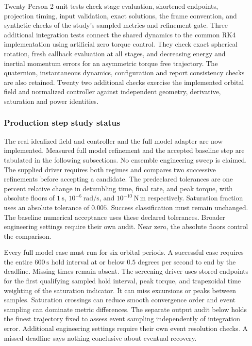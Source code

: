 Twenty Person 2 unit tests check stage evaluation, shortened endpoints,
projection timing, input validation, exact solutions, the frame convention,
and synthetic checks of the study's sampled metrics and refinement gate.
Three additional integration tests connect the shared dynamics to the common RK4 implementation using
artificial zero torque control. They check exact spherical rotation, fresh
callback evaluation at all stages, and decreasing energy and inertial momentum
errors for an asymmetric torque free trajectory. The quaternion, instantaneous dynamics, configuration
and report consistency checks are also retained. Twenty two additional checks exercise the implemented orbital field and normalized
controller against independent geometry, derivative, saturation and power identities.

\subsubsection{Production step study status}
The real idealized field and controller and the full model adapter are now implemented.
Measured full model refinement and the accepted baseline step are tabulated in the following
subsections. No ensemble engineering sweep is claimed. The supplied driver requires
both regimes and compares two successive refinements before accepting a
candidate. The predeclared tolerances are one percent relative change in detumbling
time, final rate, and peak torque, with absolute floors of $1\ \mathrm{s}$,
$10^{-6}\ \mathrm{rad/s}$, and $10^{-10}\ \mathrm{N\,m}$ respectively.
Saturation fraction uses an absolute tolerance of $0.005$. Success
classification must remain unchanged. The baseline numerical acceptance uses these declared tolerances. Broader engineering settings require their own audit. Near zero, the absolute floors control the comparison.

Every full model case must run for six orbital periods. A successful case
requires the entire $600\ \mathrm{s}$ hold interval at or below $0.5$ degrees per
second to end by the deadline. Missing times remain absent. The screening
driver uses stored endpoints for the first qualifying sampled hold interval,
peak torque, and trapezoidal time weighting of the saturation indicator.
It can miss excursions or peaks between samples. Saturation crossings can
reduce smooth convergence order and event sampling can dominate metric
differences. The separate output audit below holds the finest trajectory fixed to assess event sampling independently of integration error. Additional engineering settings require their own event resolution checks. A missed deadline says
nothing conclusive about eventual recovery.
